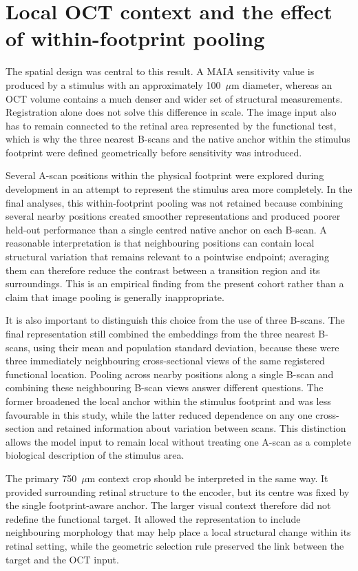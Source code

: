 \section{Local OCT context and the effect of within-footprint pooling}

The spatial design was central to this result. A MAIA sensitivity value is produced by a stimulus with an approximately 100~$\mu$m diameter, whereas an OCT volume contains a much denser and wider set of structural measurements. Registration alone does not solve this difference in scale. The image input also has to remain connected to the retinal area represented by the functional test, which is why the three nearest B-scans and the native anchor within the stimulus footprint were defined geometrically before sensitivity was introduced.

Several A-scan positions within the physical footprint were explored during development in an attempt to represent the stimulus area more completely. In the final analyses, this within-footprint pooling was not retained because combining several nearby positions created smoother representations and produced poorer held-out performance than a single centred native anchor on each B-scan. A reasonable interpretation is that neighbouring positions can contain local structural variation that remains relevant to a pointwise endpoint; averaging them can therefore reduce the contrast between a transition region and its surroundings. This is an empirical finding from the present cohort rather than a claim that image pooling is generally inappropriate.

It is also important to distinguish this choice from the use of three B-scans. The final representation still combined the embeddings from the three nearest B-scans, using their mean and population standard deviation, because these were three immediately neighbouring cross-sectional views of the same registered functional location. Pooling across nearby positions along a single B-scan and combining these neighbouring B-scan views answer different questions. The former broadened the local anchor within the stimulus footprint and was less favourable in this study, while the latter reduced dependence on any one cross-section and retained information about variation between scans. This distinction allows the model input to remain local without treating one A-scan as a complete biological description of the stimulus area.

The primary 750~$\mu$m context crop should be interpreted in the same way. It provided surrounding retinal structure to the encoder, but its centre was fixed by the single footprint-aware anchor. The larger visual context therefore did not redefine the functional target. It allowed the representation to include neighbouring morphology that may help place a local structural change within its retinal setting, while the geometric selection rule preserved the link between the target and the OCT input.

